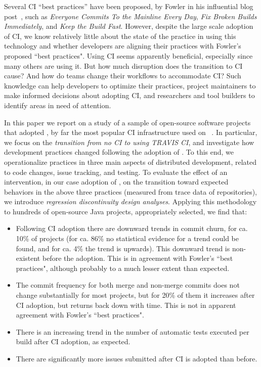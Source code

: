 Several CI ``best practices'' have been proposed, \eg by Fowler in his 
influential blog post~\cite{fowler2000continuous}, such as 
\emph{Everyone Commits To the Mainline Every Day}, 
\emph{Fix Broken Builds Immediately},
and \emph{Keep the Build Fast}.
However, despite the large scale adoption of CI, we know relatively little 
about the state of the practice in using this technology and whether 
developers are aligning their practices with Fowler's proposed ``best practices".
Using CI seems apparently beneficial, especially since many others are using it.
But how much disruption does the transition to CI cause?
And how do teams change their workflows to accommodate CI?
Such knowledge can help developers to optimize their practices, project 
maintainers to make informed decisions about adopting CI, and 
researchers and tool builders to identify areas in need of attention.

In this paper we report on a study of a sample of \GH open-source 
software projects that adopted \Tvis, by far the most popular 
CI infrastructure used on \GH~\cite{Hilton2016}.
In particular, we focus on the \emph{transition from no CI to using 
T{\footnotesize RAVIS} CI}, and investigate how development practices 
changed following the adoption of \Tvis.
To this end, we operationalize practices in three main aspects of 
distributed development, related to code changes, issue tracking, 
and testing.
To evaluate the effect of an intervention, in our case adoption of
\Tvis, on the transition toward expected behaviors in the above 
three practices (measured from trace data of \GH repositories),
we introduce \emph{regression discontinuity design analyses}.
Applying this methodology to hundreds of open-source Java 
projects, appropriately selected, we find that:


\begin{itemize}

\item Following CI adoption there are downward trends in commit churn, 
for ca. 10\% of projects (for ca. 86\% no statistical evidence for a trend 
could be found, and for ca. 4\% the trend is upwards). 
This downward trend is non-existent before the adoption. 
This is in agreement with Fowler's ``best practices", although 
probably to a much lesser extent than expected.

\item The commit frequency for both merge and non-merge commits does 
not change substantially for most projects, but for 20\% of them it increases
after CI adoption, but returns back down with time.
This is not in apparent agreement with Fowler's ``best practices".

\item There is an increasing trend in the number of automatic tests 
executed per build after CI adoption, as expected.

\item There are significantly more issues submitted after CI is 
adopted than before.

\end{itemize}


